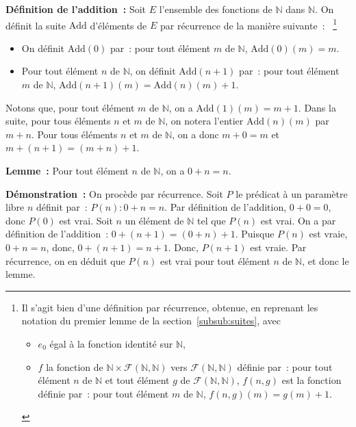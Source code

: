 \noindent\textbf{Définition de l'addition :} Soit $E$ l'ensemble des fonctions de $\mathbb{N}$ dans $\mathbb{N}$. 
    On définit la suite $\mathrm{Add}$ d'éléments de $E$ par récurrence de la manière suivante :%
    ~\footnote{
        Il s'agit bien d'une définition par récurrence, obtenue, en reprenant les notation du premier lemme de la section~\ref{subsub:suites}, avec
        \begin{itemize}[nosep]
            \item $e_0$ égal à la fonction identité sur $\mathbb{N}$,
            \item $f$ la fonction de $\mathbb{N} \times \mathcal{F}(\mathbb{N},\mathbb{N})$ vers $\mathcal{F}(\mathbb{N},\mathbb{N})$ définie par : pour tout élément $n$ de $\mathbb{N}$ et tout élément $g$ de $\mathcal{F}(\mathbb{N},\mathbb{N})$, $f(n,g)$ est la fonction définie par : pour tout élément $m$ de $\mathbb{N}$, $f(n,g)(m) = g(m) + 1$.
        \end{itemize}
    }
    \begin{itemize}[nosep]
        \item On définit $\mathrm{Add}(0)$ par : pour tout élément $m$ de $\mathbb{N}$, $\mathrm{Add}(0)(m) = m$.
        \item Pour tout élément $n$ de $\mathbb{N}$, on définit $\mathrm{Add}(n+1)$ par : pour tout élément $m$ de $\mathbb{N}$, $\mathrm{Add}(n+1)(m) = \mathrm{Add}(n)(m) + 1$.
    \end{itemize}
    Notons que, pour tout élément $m$ de $\mathbb{N}$, on a $\mathrm{Add}(1)(m) = m + 1$. 
    Dans la suite, pour tous éléments $n$ et $m$ de $\mathbb{N}$, on notera l'entier $\mathrm{Add}(n)(m)$ par $m+n$. 
    Pour tous éléments $n$ et $m$ de $\mathbb{N}$, on a donc $m+0=m$ et $m+(n+1) = (m+n)+1$.
     \sindex[isy]{$+$}

\medskip

\noindent\textbf{Lemme :} Pour tout élément $n$ de $\mathbb{N}$, on a $0+n=n$. 

\medskip

\noindent\textbf{Démonstration :} On procède par récurrence. 
    Soit $P$ le prédicat à un paramètre libre $n$ définit par : $P(n): 0+n=n$. 
    Par définition de l'addition, $0+0=0$, donc $P(0)$ est vrai.
    Soit $n$ un élément de $\mathbb{N}$ tel que $P(n)$ est vrai. 
    On a par définition de l'addition : $0+(n+1) = (0+n)+1$. 
    Puisque $P(n)$ est vraie, $0+n=n$, donc, $0+(n+1) = n+1$. 
    Donc, $P(n+1)$ est vraie. 
    Par récurrence, on en déduit que $P(n)$ est vrai pour tout élément $n$ de $\mathbb{N}$, et donc le lemme.

